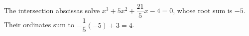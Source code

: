 The intersection abscissas solve $x^3+5x^2+\dfrac{21}{5}x-4=0$, whose root sum is $-5$. Their ordinates sum to $-\dfrac{1}{5}(-5)+3=\boxed4$.
